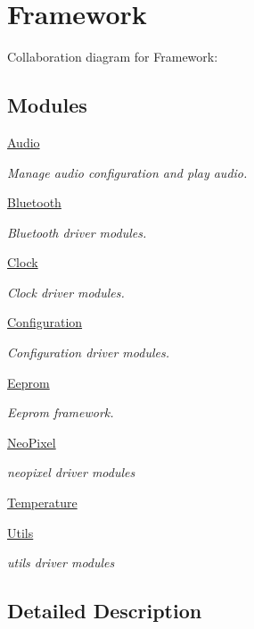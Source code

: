 \hypertarget{group___framework}{}\section{Framework}
\label{group___framework}
Collaboration diagram for Framework\+:
\subsection*{Modules}
\begin{DoxyCompactItemize}
\item 
\hyperlink{group___audio}{Audio}
\begin{DoxyCompactList}\small\item\em Manage audio configuration and play audio. \end{DoxyCompactList}\item 
\hyperlink{group___bluetooth}{Bluetooth}
\begin{DoxyCompactList}\small\item\em Bluetooth driver modules. \end{DoxyCompactList}\item 
\hyperlink{group___clock}{Clock}
\begin{DoxyCompactList}\small\item\em Clock driver modules. \end{DoxyCompactList}\item 
\hyperlink{group___configuration}{Configuration}
\begin{DoxyCompactList}\small\item\em Configuration driver modules. \end{DoxyCompactList}\item 
\hyperlink{group___eeprom}{Eeprom}
\begin{DoxyCompactList}\small\item\em Eeprom framework. \end{DoxyCompactList}\item 
\hyperlink{group___neo_pixel}{Neo\+Pixel}
\begin{DoxyCompactList}\small\item\em neopixel driver modules \end{DoxyCompactList}\item 
\hyperlink{group___temperature}{Temperature}
\item 
\hyperlink{group___utils}{Utils}
\begin{DoxyCompactList}\small\item\em utils driver modules \end{DoxyCompactList}\end{DoxyCompactItemize}


\subsection{Detailed Description}
